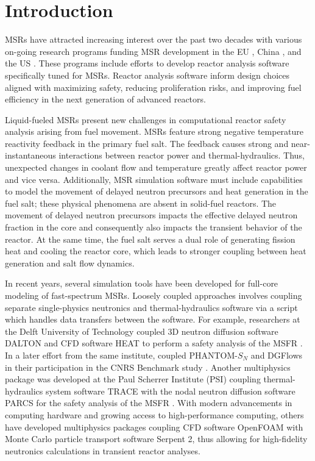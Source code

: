 \section{Introduction} \label{sec:intro}

\glspl{MSR} have attracted increasing interest over the past two
decades with various on-going research programs funding \gls{MSR} development
in the EU \citep{cordis_severe_nodate}, China \citep{dai_17_2017}, and the US
\citep{doe_office_2021}. These programs include efforts to develop
reactor analysis software specifically tuned for \glspl{MSR}. Reactor
analysis software inform design choices aligned with
maximizing safety, reducing proliferation risks, and improving fuel
efficiency in the next generation of advanced reactors.

Liquid-fueled \glspl{MSR} present new challenges in computational reactor
safety analysis arising from fuel movement. \glspl{MSR} feature strong
negative temperature reactivity feedback in the primary fuel salt. The feedback
causes strong and near-instantaneous
interactions between reactor power and thermal-hydraulics. Thus,
unexpected changes in coolant flow and temperature greatly affect reactor
power and vice versa. Additionally, \gls{MSR} simulation software must include
capabilities to model the movement of delayed neutron precursors
and heat generation in the fuel salt; these physical phenomena are
absent in solid-fuel reactors. The movement of delayed neutron precursors
impacts the effective delayed neutron fraction in the core and consequently
also impacts the transient behavior of the reactor. At the same time, the fuel
salt serves a dual role of generating fission heat and cooling the reactor
core, which leads to stronger coupling between heat generation and salt flow
dynamics.

In recent years, several simulation tools have been developed for full-core
modeling of fast-spectrum \glspl{MSR}. Loosely coupled approaches involves
coupling separate single-physics neutronics and thermal-hydraulics software via a script
which handles data transfers between the software. For example, researchers at
the Delft University of Technology coupled 3D neutron diffusion software
DALTON \citep{boer_validation_2010} and CFD software HEAT
\citep{de_zwaan_static_2007} to perform a safety analysis of the \gls{MSFR}
\citep{fiorina_modelling_2014}. In a later effort from the same institute,
\cite{tiberga_discontinuous_2019} coupled PHANTOM-$S_N$ and DGFlows
in their participation in the
\gls{CNRS} Benchmark study \citep{tiberga_results_2020}. Another multiphysics
package was developed at the Paul Scherrer Institute (PSI) coupling
thermal-hydraulics system software \gls{TRACE} \citep{nrc_trace_2007} with the
nodal neutron diffusion software \gls{PARCS} \citep{downar_parcs_2010} for the
safety analysis of the \gls{MSFR} \citep{pettersen_coupled_2016}. With modern
advancements in computing hardware and growing access to high-performance
computing, others \citep{laureau_transient_2017,blanco_neutronic_2020} have
developed multiphysics packages coupling \gls{CFD} software
OpenFOAM with Monte Carlo particle transport software Serpent 2, thus allowing
for high-fidelity neutronics calculations in transient reactor analyses.

